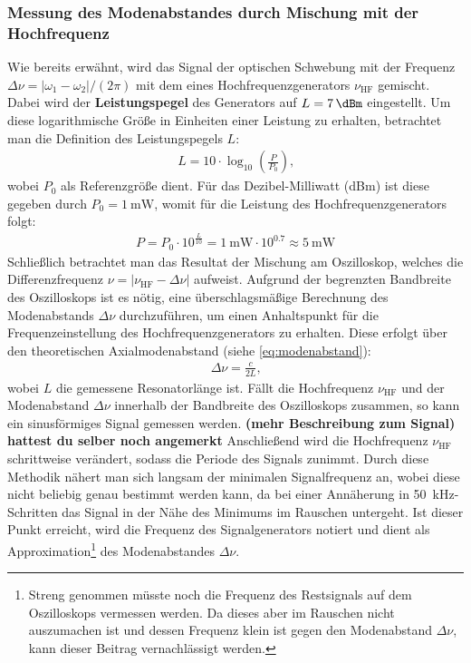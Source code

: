 \documentclass[11pt, a4paper]{article}
\numberwithin{equation}{section}
\begin{document}
\subsubsection{Messung des Modenabstandes durch Mischung mit der Hochfrequenz}
Wie bereits erwähnt, wird das Signal der optischen Schwebung mit der Frequenz $\Delta \nu = |\omega_1 - \omega_2| / (2\pi)$ mit dem eines Hochfrequenzgenerators $\nu_\mathrm{HF}$ gemischt.
Dabei wird der \textbf{Leistungspegel} des Generators auf $L = \SI{+7}{\dBm}$ eingestellt. Um diese logarithmische Größe in Einheiten einer Leistung zu erhalten, betrachtet man die Definition des Leistungspegels $L$: 
\begin{align}
	L = 10 \cdot \log_{10}\left( \frac{P}{P_0}\right) \text{,}
\end{align}
wobei $P_0$ als Referenzgröße dient.
Für das Dezibel-Milliwatt (\si{dBm}) ist diese gegeben durch $P_0 = \SI{1}{\milli\watt}$, womit für die Leistung des Hochfrequenzgenerators folgt:
\begin{align}
	P = P_0 \cdot 10^{\frac{L}{10}} = \SI{1}{\milli\watt} \cdot 10^{\num{0.7}} \approx \SI{5}{\milli\watt}
\end{align}
Schließlich betrachtet man das Resultat der Mischung am Oszilloskop, welches die Differenzfrequenz $\nu = |\nu_\mathrm{HF} - \Delta \nu|$ aufweist.
Aufgrund der begrenzten Bandbreite des Oszilloskops ist es nötig, eine überschlagsmäßige Berechnung des Modenabstands $\Delta \nu$ durchzuführen, um einen Anhaltspunkt für die Frequenzeinstellung des Hochfrequenzgenerators zu erhalten.
Diese erfolgt über den theoretischen Axialmodenabstand (siehe \eqref{eq:modenabstand}):
\begin{align}
	\Delta \nu = \frac{c}{2 L} \text{,}
\end{align}
wobei $L$ die gemessene Resonatorlänge ist.
Fällt die Hochfrequenz $\nu_\mathrm{HF}$ und der Modenabstand $\Delta \nu$ innerhalb der Bandbreite des Oszilloskops zusammen, so kann ein sinusförmiges Signal gemessen werden.
\textbf{(mehr Beschreibung zum Signal) hattest du selber noch angemerkt}
Anschließend wird die Hochfrequenz $\nu_\mathrm{HF}$ schrittweise verändert, sodass die Periode des Signals zunimmt.
Durch diese Methodik nähert man sich langsam der minimalen Signalfrequenz an, wobei diese nicht beliebig genau bestimmt werden kann, da bei einer Annäherung in \SI{50}{\kilo\hertz}-Schritten das Signal in der Nähe des Minimums im Rauschen untergeht.
Ist dieser Punkt erreicht, wird die Frequenz des Signalgenerators notiert und dient als Approximation\footnote{Streng genommen müsste noch die Frequenz des Restsignals auf dem Oszilloskops vermessen werden. Da dieses aber im Rauschen nicht auszumachen ist und dessen Frequenz klein ist gegen den Modenabstand $\Delta \nu$, kann dieser Beitrag vernachlässigt werden.} des Modenabstandes $\Delta \nu$.
\end{document}
